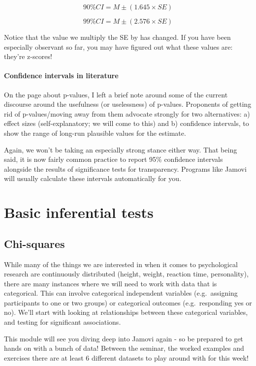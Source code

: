 \documentclass[
]{book}
\begin{document}
\[
90\% CI = M \pm (1.645 \times SE)
\]

\[
99\% CI = M \pm (2.576 \times SE)
\]

Notice that the value we multiply the SE by has changed. If you have been especially observant so far, you may have figured out what these values are: they're z-scores!

\subsection{Confidence intervals in literature}\label{confidence-intervals-in-literature}

On the page about p-values, I left a brief note around some of the current discourse around the usefulness (or uselessness) of p-values. Proponents of getting rid of p-values/moving away from them advocate strongly for two alternatives: a) effect sizes (self-explanatory; we will come to this) and b) confidence intervals, to show the range of long-run plausible values for the estimate.

Again, we won't be taking an especially strong stance either way. That being said, it is now fairly common practice to report 95\% confidence intervals alongside the results of significance tests for transparency. Programs like Jamovi will usually calculate these intervals automatically for you.

\part{Basic inferential tests}\label{part-basic-inferential-tests}

\chapter{Chi-squares}\label{chi-squares}

While many of the things we are interested in when it comes to psychological research are continuously distributed (height, weight, reaction time, personality), there are many instances where we will need to work with data that is categorical. This can involve categorical independent variables (e.g.~assigning participants to one or two groups) or categorical outcomes (e.g.~responding yes or no). We'll start with looking at relationships between these categorical variables, and testing for significant associations.

This module will see you diving deep into Jamovi again - so be prepared to get hands on with a bunch of data! Between the seminar, the worked examples and exercises there are at least 6 different datasets to play around with for this week!
\end{document}
